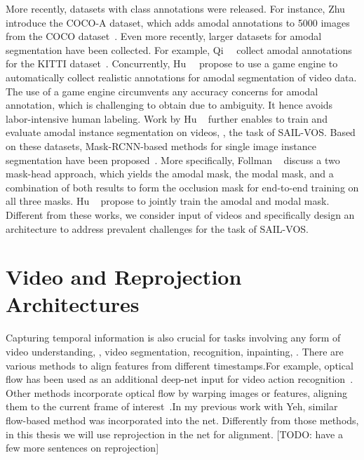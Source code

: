 More recently, datasets with class annotations were released. For instance, Zhu~\etal~\cite{zhu2017semantic} introduce the COCO-A dataset, which adds amodal annotations to 5000  images from the COCO dataset~\cite{lin2014microsoft}. Even more recently, larger datasets for amodal segmentation have been collected. For example, Qi~\etal~\cite{qi2019amodal} collect amodal annotations for the KITTI dataset~\cite{geiger2012we}. Concurrently, Hu~\etal~\cite{hu2019sail} propose to use a game engine to automatically collect realistic  annotations for amodal segmentation of video data. The use of a game engine circumvents any accuracy concerns for amodal annotation, which is %
challenging to obtain due to ambiguity. It hence avoids labor-intensive human labeling. Work by Hu \etal~\cite{hu2019sail} further enables to train and evaluate amodal instance segmentation on videos, \ie, the task of SAIL-VOS. Based on these datasets, Mask-RCNN-based methods for single image instance segmentation have been proposed~\cite{follmann2019learning, hu2019sail}. More specifically, Follman \etal~\cite{follmann2019learning} discuss a two mask-head approach, which yields the amodal mask, the modal mask, and a combination of both results to form the occlusion mask for end-to-end training on all three masks. Hu \etal~\cite{hu2019sail} propose to jointly train the amodal and modal mask. Different from these works, we consider input of videos and specifically design an architecture to address prevalent challenges for the task of SAIL-VOS.


\section{Video and Reprojection Architectures}
Capturing temporal information is also crucial for tasks involving any form of video understanding, \eg, video segmentation, recognition, inpainting, \etc. There are various methods to align features from different timestamps.For example, optical flow has been used as an additional deep-net input for video action recognition~\cite{simonyan2014two, singh2016first}. Other methods incorporate optical flow by warping images or features, aligning them to the current frame of interest~\cite{hu2017maskrnn,gadde2017semantic, kim2019deep}.In my previous work with Yeh, similar flow-based method was incorporated into the net. Differently from those methods, in this thesis we will use reprojection in the net for alignment.
[TODO: have a few more sentences on reprojection]
